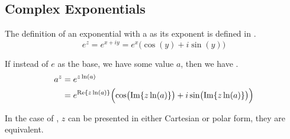 \subsection{Complex Exponentials}\label{subsec:Complex_Exponentials}
The definition of an exponential with a  as its exponent is defined in .
\begin{equation}\label{eq:Complex_Exponential}
  e^{z} = e^{x + iy} = e^{x} \bigl( \cos(y) + i \sin(y) \bigr)
\end{equation}

If instead of $e$ as the base, we have some value $a$, then we have .
\begin{equation}\label{eq:Complex_Exponential_Diff_Base}
  \begin{aligned}
    a^{z} &= e^{z \ln(a)} \\
    &= e^{\operatorname{Re} \lbrace z \ln(a) \rbrace} \Bigl( \cos \bigl(\operatorname{Im} \lbrace z \ln(a) \rbrace \bigr) + i \sin \bigl(\operatorname{Im} \lbrace z \ln(a) \rbrace \bigl) \Bigr)
  \end{aligned}
\end{equation}

In the case of , $z$ can be presented in either Cartesian or polar form, they are equivalent.


